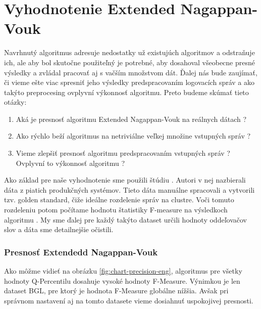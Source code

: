 \chapter{Vyhodnotenie Extended Nagappan-Vouk}
Navrhnutý algoritmus adresuje nedostatky už existujúch algoritmov a odstraňuje ich, ale aby bol skutočne použiteľný je potrebné, aby dosahoval  všeobecne presné výsledky a zvládal pracovať aj s vačším množstvom dát. Ďalej nás bude zaujímať, či vieme ešte viac spresniť jeho výsledky predspracovaním logovacích správ a ako takýto preprocesing ovplyvní výkonnosť algoritmu. Preto budeme skúmať tieto otázky:

\begin{enumerate}
  \item Aká je presnosť algoritmu Extended Nagappan-Vouk na reálnych dátach ?
  \item Ako rýchlo beží algoritmus na netriviálne veľkej množine vstupných správ ?
  \item Vieme zlepšiť presnosť algoritmu predspracovaním vstupných správ ? Ovplyvní to výkonnosť algoritmu ?
\end{enumerate}

Ako základ pre naše vyhodnotenie sme použili štúdiu \parencite{he2016}. Autori v nej nazbierali dáta z piatich produkčných systémov. Tieto dáta manuálne spracovali a vytvorili tzv. golden standard, čiže ideálne rozdelenie správ na clustre. Voči tomuto rozdeleniu potom počítame hodnotu štatistiky F-measure na výsledkoch algoritmu \parencite{goldenstandard}. My sme ďalej pre každý takýto dataset určili hodnoty oddeľovačov slov a dáta sme detailnejšie očistili.

\subsection{Presnosť Extendedd Nagappan-Vouk}
Ako môžme vidieť na obrázku \ref{fig:chart-precision-eng}, algoritmus pre všetky hodnoty Q-Percentilu dosahuje vysoké hodnoty F-Measure. Výnimkou je len dataset BGL, pre ktorý je hodnota F-Measure globálne nížšia. Avšak pri správnom nastavení aj na tomto datasete vieme dosiahnuť uspokojivej presnosti.

